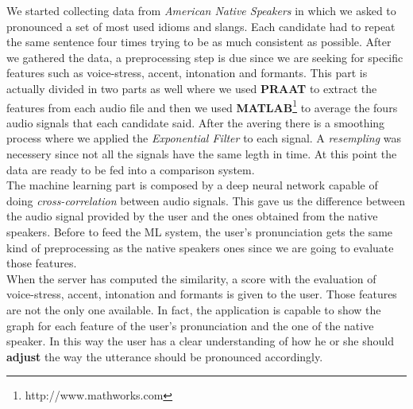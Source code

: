 \noindent We started collecting data from \textit{American Native Speakers} in which we asked to pronounced a set of most used idioms and slangs. Each candidate had to repeat the same sentence four times trying to be as much consistent as possible. After we gathered the data, a preprocessing step is due since we are seeking for specific features such as voice-stress, accent, intonation and formants. This part is actually divided in two parts as well where we used \textbf{PRAAT}\cite{boersma2010p} to extract the features from each audio file and then we used \textbf{MATLAB}\footnote{http://www.mathworks.com} to average the fours audio signals that each candidate said. After the avering there is a smoothing process where we applied the \textit{Exponential Filter} to each signal. A \textit{resempling} was necessery since not all the signals have the same legth in time. At this point the data are ready to be fed into a comparison system. \\

\noindent The machine learning part is composed by a deep neural network capable of doing \textit{cross-correlation} between audio signals. This gave us the difference between the audio signal provided by the user and the ones obtained from the native speakers. Before to feed the ML system, the user's pronunciation gets the same kind of preprocessing as the native speakers ones since we are going to evaluate those features. \\

\noindent When the server has computed the similarity, a score with the evaluation of voice-stress, accent, intonation and formants is given to the user. Those features are not the only one available. In fact, the application is capable to show the graph for each feature of the user's pronunciation and the one of the native speaker. In this way the user has a clear understanding of how he or she should \textbf{adjust} the way the utterance should be pronounced accordingly. \\


